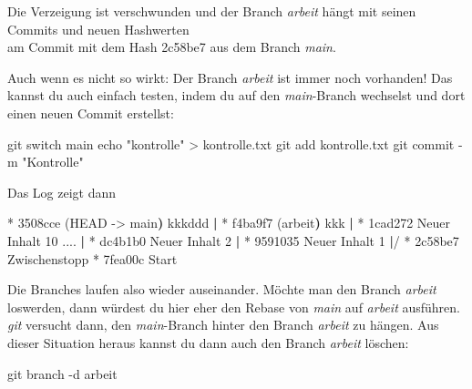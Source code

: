 \documentclass[
  letterpaper,
  DIV=11]{scrreprt}
\newenvironment{Shaded}{\begin{snugshade}}{\end{snugshade}}
\newcommand{\AttributeTok}[1]{\textcolor[rgb]{0.40,0.45,0.13}{#1}}
\newcommand{\BuiltInTok}[1]{\textcolor[rgb]{0.00,0.23,0.31}{#1}}
\newcommand{\ErrorTok}[1]{\textcolor[rgb]{0.68,0.00,0.00}{#1}}
\newcommand{\ExtensionTok}[1]{\textcolor[rgb]{0.00,0.23,0.31}{#1}}
\newcommand{\FunctionTok}[1]{\textcolor[rgb]{0.28,0.35,0.67}{#1}}
\newcommand{\KeywordTok}[1]{\textcolor[rgb]{0.00,0.23,0.31}{\textbf{#1}}}
\newcommand{\NormalTok}[1]{\textcolor[rgb]{0.00,0.23,0.31}{#1}}
\newcommand{\OperatorTok}[1]{\textcolor[rgb]{0.37,0.37,0.37}{#1}}
\newcommand{\StringTok}[1]{\textcolor[rgb]{0.13,0.47,0.30}{#1}}
\newcommand{\git}{\textit{git}\xspace}
\newcommand{\branch}[1]{\textit{#1}\xspace}
\begin{document}
Die Verzeigung ist verschwunden und der Branch \branch{arbeit} hängt mit
seinen Commits und neuen Hashwerten\\
am Commit mit dem Hash 2c58be7 aus dem Branch \branch{main}.

Auch wenn es nicht so wirkt: Der Branch \branch{arbeit} ist immer noch
vorhanden! Das kannst du auch einfach testen, indem du auf den
\branch{main}-Branch wechselst und dort einen neuen Commit erstellst:

\begin{Shaded}
\begin{Highlighting}[]
\FunctionTok{git}\NormalTok{ switch main }
\BuiltInTok{echo} \StringTok{"kontrolle"} \OperatorTok{\textgreater{}}\NormalTok{ kontrolle.txt }
\FunctionTok{git}\NormalTok{ add kontrolle.txt }
\FunctionTok{git}\NormalTok{ commit }\AttributeTok{{-}m} \StringTok{"Kontrolle"}
\end{Highlighting}
\end{Shaded}

Das Log zeigt dann

\begin{Shaded}
\begin{Highlighting}[]
\ExtensionTok{*}\NormalTok{ 3508cce }\ErrorTok{(}\ExtensionTok{HEAD} \AttributeTok{{-}}\OperatorTok{\textgreater{}}\NormalTok{ main}\KeywordTok{)} \ExtensionTok{kkkddd}
\KeywordTok{|} \ExtensionTok{*}\NormalTok{ f4ba9f7 }\ErrorTok{(}\ExtensionTok{arbeit}\KeywordTok{)} \ExtensionTok{kkk}
\KeywordTok{|} \ExtensionTok{*}\NormalTok{ 1cad272 Neuer Inhalt 10}
\ExtensionTok{....}
\KeywordTok{|} \ExtensionTok{*}\NormalTok{ dc4b1b0 Neuer Inhalt 2}
\KeywordTok{|} \ExtensionTok{*}\NormalTok{ 9591035 Neuer Inhalt 1}
\KeywordTok{|}\ExtensionTok{/}  
\ExtensionTok{*}\NormalTok{ 2c58be7 Zwischenstopp}
\ExtensionTok{*}\NormalTok{ 7fea00c Start}
\end{Highlighting}
\end{Shaded}

Die Branches laufen also wieder auseinander. Möchte man den Branch
\branch{arbeit} loswerden, dann würdest du hier eher den Rebase von
\branch{main} auf \branch{arbeit} ausführen. \git versucht dann, den
\branch{main}-Branch hinter den Branch \branch{arbeit} zu hängen. Aus
dieser Situation heraus kannst du dann auch den Branch \branch{arbeit}
löschen:

\begin{Shaded}
\begin{Highlighting}[]
\FunctionTok{git}\NormalTok{ branch }\AttributeTok{{-}d}\NormalTok{ arbeit }
\end{Highlighting}
\end{Shaded}
\end{document}
